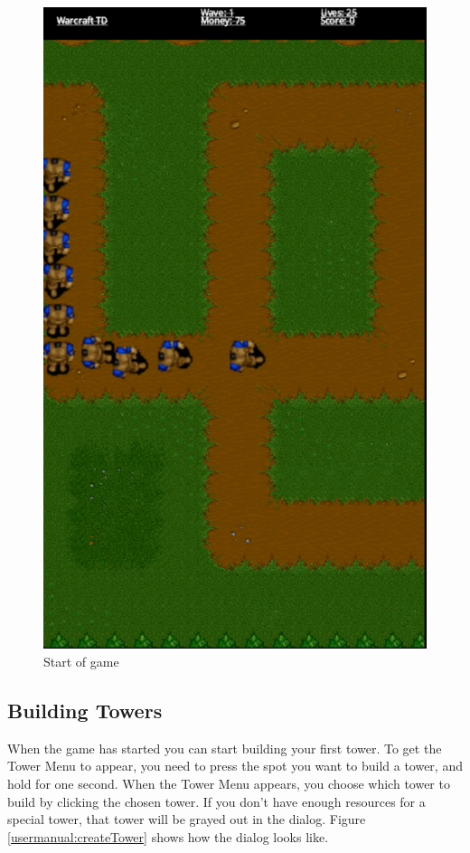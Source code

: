 \begin{figure} [h]
	\center
		\includegraphics[scale=0.5]{main/figures/screenshots/play}
		\caption{Start of game}
		\label{usermanual:startGame}
\end{figure}

\subsection{Building Towers}
When the game has started you can start building your first tower. To get the Tower Menu to appear, you need to press the spot you want to build a tower, and hold for one second. When the Tower Menu appears, you choose which tower to build by clicking the chosen tower. If you don’t have enough resources for a special tower, that tower will be grayed out in the dialog. Figure \ref{usermanual:createTower} shows how the dialog looks like.

